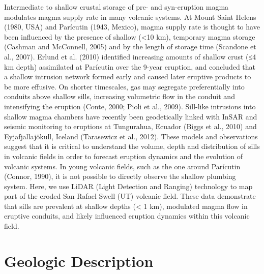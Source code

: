 \documentclass[12pt,letter]{article}
\begin{document}
Intermediate to shallow crustal storage of pre- and syn-eruption magma modulates magma supply rate in many volcanic systems. At Mount Saint Helens (1980, USA) and Parícutin (1943, Mexico), magma supply rate is thought to have been influenced by the presence of shallow (<10 km), temporary magma storage (Cashman and McConnell, 2005) and by the length of storage time (Scandone et al., 2007). Erlund et al. (2010) identified increasing amounts of shallow crust (≤4 km depth) assimilated at Parícutin over the 9-year eruption, and concluded that a shallow intrusion network formed early and caused later eruptive products to be more effusive. On shorter timescales, gas may segregate preferentially into conduits above shallow sills, increasing volumetric flow in the conduit and intensifying the eruption (Conte, 2000; Pioli et al., 2009). Sill-like intrusions into shallow magma chambers have recently been geodetically linked with InSAR and seismic monitoring to eruptions at Tungurahua, Ecuador (Biggs et al., 2010) and Eyjafjallajökull, Iceland (Tarasewicz et al., 2012). These models and observations suggest that it is critical to understand the volume, depth and distribution of sills in volcanic fields in order to forecast eruption dynamics and the evolution of volcanic systems. In young volcanic fields, such as the one around Parícutin (Connor, 1990), it is not possible to directly observe the shallow plumbing system. Here, we use LiDAR (Light Detection and Ranging) technology to map part of the eroded San Rafael Swell (UT) volcanic field. These data demonstrate that sills are prevalent at shallow depths (< 1 km), modulated magma flow in eruptive conduits, and likely influenced eruption dynamics within this volcanic field.


\section{Geologic Description}
\end{document}

